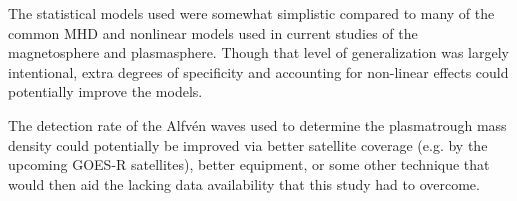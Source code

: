 The statistical models used were somewhat simplistic compared to many of the common MHD and nonlinear models used in current studies of the magnetosphere and plasmasphere.  Though that level of generalization was largely intentional, extra degrees of specificity and accounting for non-linear effects could potentially improve the models.

The detection rate of the Alfvén waves used to determine the plasmatrough mass density could potentially be improved via better satellite coverage (e.g. by the upcoming GOES-R satellites), better equipment, or some other technique that would then aid the lacking data availability that this study had to overcome. 
